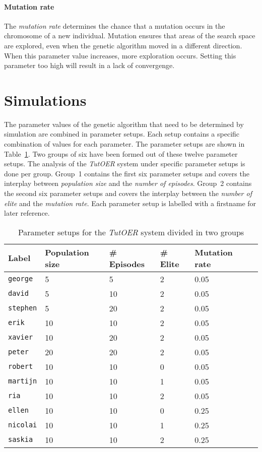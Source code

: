 \paragraph{Mutation rate} The \emph{mutation rate} determines the chance that a
mutation occurs in the chromosome of a new individual. Mutation ensures that
areas of the search space are explored, even when the genetic algorithm moved
in a different direction. When this parameter value increases, more exploration
occurs. Setting this parameter too high will result in a lack of convergenge.
\section{Simulations}
\label{sec:simulations_simulations}
The parameter values of the genetic algorithm that need to be determined by
simulation are combined in parameter setups. Each setup contains a specific
combination of values for each parameter. The parameter setups are shown in
Table~\ref{tab:simulation_setups}. Two groups of six have been formed out of
these twelve parameter setups. The analysis of the \emph{TutOER} system under
specific parameter setups is done per group. Group~1 contains the first six
parameter setups and covers the interplay between \emph{population size} and
the \emph{number of episodes}. Group~2 contains the second six parameter setups
and covers the interplay between the \emph{number of elite} and the
\emph{mutation rate}. Each parameter setup is labelled with a firstname for
later reference.\\
\begin{table}[h!]
	\centering
	\begin{tabular}{llllll}\hline
		\textbf{Label} & \textbf{Population size} & \textbf{\# Episodes}
		& \textbf{\# Elite} & \textbf{Mutation rate} \\\hline
		\texttt{george} & 5 & 5 & 2 & 0.05 \\
		\texttt{david} & 5 & 10 & 2 & 0.05 \\
		\texttt{stephen} & 5 & 20 & 2 & 0.05 \\
		\texttt{erik} & 10 & 10 & 2 & 0.05 \\
		\texttt{xavier} & 10 & 20 & 2 & 0.05 \\
		\texttt{peter} & 20 & 20 & 2 & 0.05 \\\hdashline
		\texttt{robert} & 10 & 10 & 0 & 0.05 \\
		\texttt{martijn} & 10 & 10 & 1 & 0.05 \\
		\texttt{ria} & 10 & 10 & 2 & 0.05 \\
		\texttt{ellen} & 10 & 10 & 0 & 0.25 \\
		\texttt{nicolai} & 10 & 10 & 1 & 0.25 \\
		\texttt{saskia} & 10 & 10 & 2 & 0.25 \\
	\end{tabular}
	\caption{Parameter setups for the \emph{TutOER} system divided in two groups}
	\label{tab:simulation_setups}
\end{table}\\

